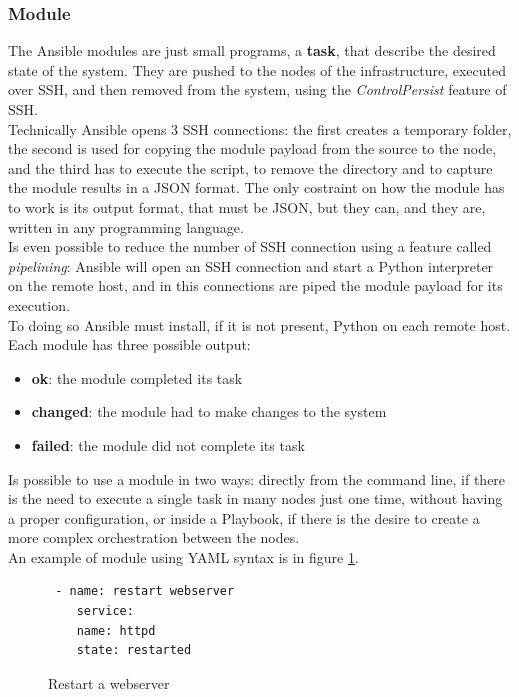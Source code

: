 \documentclass[conference]{IEEEtran}
\begin{document}
\subsubsection{Module}
The Ansible modules are just small programs, a  \textbf{task}, that describe the desired state of the system. They are pushed to the nodes of the infrastructure, executed over SSH, and then removed from the system, using the \textit{ControlPersist} feature of SSH.\\
Technically Ansible opens 3 SSH connections: the first creates a temporary folder, the second is used for copying the module payload from the source to the node, and the third has to execute the script, to remove the directory and to capture the module results in a JSON format. The only costraint on how the module has to work is its output format, that must be JSON, but they can, and they are, written in any programming language.\\
Is even possible to reduce the number of SSH connection using a feature called \textit{pipelining}: Ansible will open an SSH connection and start a Python interpreter on the remote host, and in this connections are piped the module payload for its execution.\\
To doing so Ansible must install, if it is not present, Python on each remote host.\\
Each module has three possible output:
\begin{itemize}
    \item \textbf{ok}: the module completed its task
    \item \textbf{changed}: the module had to make changes to the system
    \item \textbf{failed}: the module did not complete its task
\end{itemize}
Is possible to use a module in two ways: directly from the command line, if there is the need to execute a single task in many nodes just one time, without having a proper configuration, or inside a Playbook, if there is the desire to create a more complex orchestration between the nodes.\\
An example of module using YAML syntax is in figure \ref{restartsever}.\\
\begin{figure}[h]
\begin{verbatim}
 - name: restart webserver
    service:
    name: httpd
    state: restarted
  \end{verbatim}
  \caption{Restart a webserver}
  \label{restartsever}
\end{figure}\\
\end{document}
